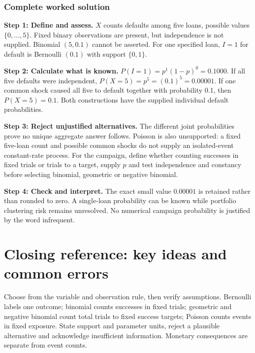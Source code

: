 \subsubsection*{Complete worked solution}
\par\noindent\begin{minipage}{\linewidth}
\textbf{Step 1: Define and assess.} $X$ counts defaults among five loans, possible values $\{0,\ldots,5\}$. Fixed binary observations are present, but independence is not supplied. Binomial $(5,0.1)$ cannot be asserted. For one specified loan, $I=1$ for default is Bernoulli $(0.1)$ with support $\{0,1\}$.
\end{minipage}\par\medskip
\par\noindent\begin{minipage}{\linewidth}
\textbf{Step 2: Calculate what is known.} $P(I=1)=p^1(1-p)^0=0.1000$. If all five defaults were independent, $P(X=5)=p^5=(0.1)^5=0.00001$. If one common shock caused all five to default together with probability 0.1, then $P(X=5)=0.1$. Both constructions have the supplied individual default probabilities.
\end{minipage}\par\medskip
\par\noindent\begin{minipage}{\linewidth}
\textbf{Step 3: Reject unjustified alternatives.} The different joint probabilities prove no unique aggregate answer follows. Poisson is also unsupported: a fixed five-loan count and possible common shocks do not supply an isolated-event constant-rate process. For the campaign, define whether counting successes in fixed trials or trials to a target, supply $p$ and test independence and constancy before selecting binomial, geometric or negative binomial.
\end{minipage}\par\medskip
\par\noindent\begin{minipage}{\linewidth}
\textbf{Step 4: Check and interpret.} The exact small value $0.00001$ is retained rather than rounded to zero. A single-loan probability can be known while portfolio clustering risk remains unresolved. No numerical campaign probability is justified by the word infrequent.
\end{minipage}\par\medskip
{}
\section{Closing reference: key ideas and common errors}
Choose from the variable and observation rule, then verify assumptions. Bernoulli labels one outcome; binomial counts successes in fixed trials; geometric and negative binomial count total trials to fixed success targets; Poisson counts events in fixed exposure. State support and parameter units, reject a plausible alternative and acknowledge insufficient information. Monetary consequences are separate from event counts.
\secInicio

